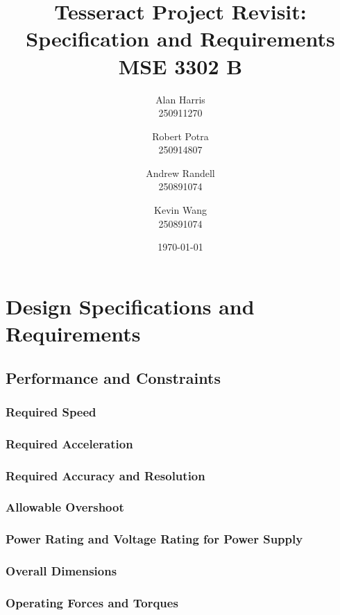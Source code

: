 \documentclass[12pt]{article}
\begin{document}
\title{\textbf{Tesseract Project Revisit:\\Specification and Requirements\\ MSE 3302 B}}
\author{
  Alan Harris\\
  250911270
  \and
  Robert Potra\\
  250914807
  \and
  Andrew Randell\\
  250891074
  \and
  Kevin Wang\\
  250891074
}
\date{\today}
\maketitle

\tableofcontents
\thispagestyle{empty}

\pagebreak
\setcounter{page}{1}
 
\section{Design Specifications and Requirements}
\subsection{Performance and Constraints}
\subsubsection{Required Speed}
\subsubsection{Required Acceleration}
\subsubsection{Required Accuracy and Resolution}
\subsubsection{Allowable Overshoot}
\subsubsection{Power Rating and Voltage Rating for Power Supply}
\subsubsection{Overall Dimensions}
\subsubsection{Operating Forces and Torques}
\end{document}
